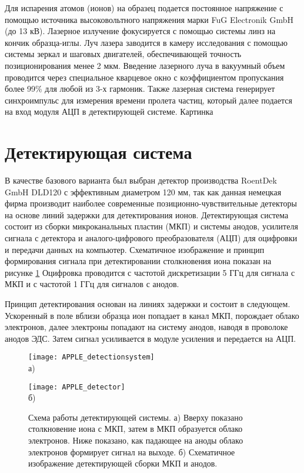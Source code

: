 Для испарения атомов (ионов) на образец подается постоянное напряжение с помощью источника высоковольтного напряжения марки FuG Electronik GmbH (до 13 кВ). Лазерное излучение фокусируется с помощью системы линз на кончик образца-иглы. Луч лазера заводится в камеру исследования с помощью системы зеркал и шаговых двигателей, обеспечивающей точность позиционирования менее 2 мкм. Введение лазерного луча в вакуумный объем проводится через специальное кварцевое окно с коэффициентом пропускания более 99\% для любой из 3-х гармоник. Также лазерная система генерирует синхроимпульс для измерения времени пролета частиц, который далее подается на вход модуля АЦП в детектирующей системе.
 Картинка


\FloatBarrier

\section{Детектирующая система}\label{sec:ch2/sec4}

В качестве базового варианта был выбран детектор производства RoentDek GmbH DLD120 с эффективным диаметром 120 мм, так как данная немецкая фирма производит наиболее современные позиционно-чувствительные детекторы на основе линий задержки для детектирования ионов. Детектирующая система состоит из сборки микроканальных пластин (МКП) и системы анодов, усилителя сигнала с детектора и аналого-цифрового преобразователя (АЦП) для оцифровки и передачи данных на компьютер. Схематичное изображение и принцип формирования сигнала при детектировании столкновения иона показан на рисунке \cref{fig:APPLE_detectionsystem} Оцифровка проводится с частотой дискретизации 5 ГГц для сигнала с МКП и с частотой 1 ГГц для сигналов с анодов. 

Принцип детектирования \cite{Spillman00} основан на линиях задержки и состоит в следующем. Ускоренный в поле вблизи образца ион попадает в канал МКП, порождает облако электронов, далее электроны попадают на систему анодов, наводя в проволоке анодов ЭДС. Затем сигнал усиливается в модуле усиления и передается на АЦП.

\begin{figure}[ht]
	\begin{minipage}[b]{0.49\textwidth}\centering
		\texttt{[image: APPLE\_detectionsystem]} \\ а)
	\end{minipage}
	\begin{minipage}[b]{0.49\textwidth}\centering
		\texttt{[image: APPLE\_detector]} \\ б)
	\end{minipage}
	\caption{Схема работы детектирующей системы. а) Вверху показано столкновение иона с МКП, затем в МКП образуется облако электронов. Ниже показано, как падающее на аноды облако электронов формирует сигнал на выходе. б) Схематичное изображение детектирующей сборки МКП и анодов.}
	\label{fig:APPLE_detectionsystem}
\end{figure}


